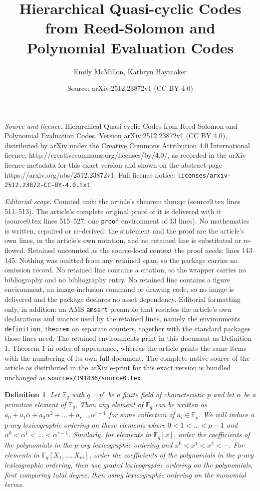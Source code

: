 \documentclass[10pt,a4paper]{amsart}
\title{Hierarchical Quasi-cyclic Codes from Reed-Solomon and Polynomial Evaluation Codes}
\author{Emily McMillon, Kathryn Haymaker}
\date{Source: arXiv:2512.23872v1 (CC BY 4.0)}
\newtheorem{definition}{Definition}
\newcommand{\F}{\mathbb{F}}
\begin{document}
\maketitle

\noindent\emph{Source and licence.} Hierarchical Quasi-cyclic Codes from Reed-Solomon and Polynomial Evaluation Codes. Version arXiv:2512.23872v1 (CC BY 4.0), distributed by arXiv under the Creative Commons Attribution 4.0 International licence, http://creativecommons.org/licenses/by/4.0/, as recorded in the arXiv licence metadata for this exact version and shown on the abstract page https://arxiv.org/abs/2512.23872v1. Full licence notice: \texttt{licenses/arxiv-2512.23872-CC-BY-4.0.txt}.\par\smallskip

\noindent\textit{Editorial scope.} Counted unit: the article's theorem thm:qc (source0.tex lines 511--513). The article's complete original proof of it is delivered with it (source0.tex lines 515--527, one \texttt{proof} environment of 13 lines). No mathematics is written, repaired or re-derived: the statement and the proof are the article's own lines, in the article's own notation, and no retained line is substituted or re-flowed.  Retained uncounted as the source-local context the proof needs: lines 143--145.  Nothing was omitted from any retained span, so the package carries no omission record.  No retained line contains a citation, so the wrapper carries no bibliography and no bibliography entry.  No retained line contains a figure environment, an image-inclusion command or drawing code, so no image is delivered and the package declares no asset dependency.  Editorial formatting only, in addition: an AMS \texttt{amsart} preamble that restates the article's own declarations and macros used by the retained lines, namely the environments \texttt{definition}, \texttt{theorem} on separate counters, together with the standard packages those lines need.  The retained environments print in this document as Definition 1, Theorem 1 in order of appearance, whereas the article prints the same items with the numbering of its own full document.  The complete native source of the article as distributed in the arXiv e-print for this exact version is bundled unchanged as \texttt{sources/191836/source0.tex}.
\begin{definition} \label{def:pary}
    Let $\F_q$ with $q = p^r$ be a finite field of characteristic $p$ and let $\alpha$ be a primitive element of $\F_q$. Then any element of $\F_q$ can be written as $a_0 + a_1 \alpha + a_2 \alpha^2 + \dots + a_{r-1}\alpha^{r-1}$ for some collection of $a_i \in \F_p$. We will induce a \textit{$p$-ary lexicographic ordering} on these elements where $0 < 1 < \dots < p-1$ and $\alpha^0 < \alpha^1 < \dots < \alpha^{r-1}$. Similarly, for elements in $\F_q[x]$, order the coefficients of the polynomials in the $p$-ary lexicographic ordering and $x^0 < x^1< x^2 < \cdots$. For elements in $\mathbb{F}_{q}[X_1, \ldots, X_m]$,  order the coefficients of the polynomials in the $p$-ary lexicographic ordering, then use graded lexicographic ordering on the polynomials, first comparing total degree, then using lexicographic ordering on the monomial terms. 
\end{definition}
\end{document}
